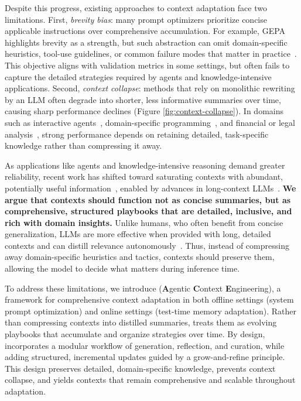 Despite this progress, existing approaches to context adaptation face two limitations.
First, \textit{brevity bias}: many prompt optimizers prioritize concise applicable instructions over comprehensive accumulation.
For example, GEPA~\citep{agrawal2025gepa} highlights brevity as a strength, but such abstraction can omit domain-specific heuristics, tool-use guidelines, or common failure modes that matter in practice~\citep{gao2025prompt}.
This objective aligns with validation metrics in some settings, but often fails to capture the detailed strategies required by agents and knowledge-intensive applications.
Second, \textit{context collapse}: methods that rely on monolithic rewriting by an LLM often degrade into shorter, less informative summaries over time, causing sharp performance declines (Figure \ref{fig:context-collapse}).
In domains such as interactive agents~\citep{trivedi2024appworld, patil2024gorilla, zhang2024caravan}, domain-specific programming~\citep{ye2023generating, zhang2025adaptive, zhang2025accelopt, mang2025frontiercs}, and financial or legal analysis~\citep{loukas2022finer, guha2023legalbench, wang2025finlora}, strong performance depends on retaining detailed, task-specific knowledge rather than compressing it away.

As applications like agents and knowledge-intensive reasoning demand greater reliability, recent work has shifted toward saturating contexts with abundant, potentially useful information~\citep{jiang2025putting, chung2025long, chen2025flora}, enabled by advances in long-context LLMs~\citep{peng2023yarn, mao2024lift}.
\textbf{We argue that contexts should function not as concise summaries, but as comprehensive, structured playbooks that are detailed, inclusive, and rich with domain insights.}
Unlike humans, who often benefit from concise generalization, LLMs are more effective when provided with long, detailed contexts and can distill relevance autonomously~\citep{jiang2025putting, liu2025selfelicit, suzgun2025dynamic}.
Thus, instead of compressing away domain-specific heuristics and tactics, contexts should preserve them, allowing the model to decide what matters during inference time.

To address these limitations, we introduce \name (\textbf{A}gentic \textbf{C}ontext \textbf{E}ngineering), a framework for comprehensive context adaptation in both offline settings (\eg system prompt optimization) and online settings (\eg test-time memory adaptation).
Rather than compressing contexts into distilled summaries, \name treats them as evolving playbooks that accumulate and organize strategies over time.
By design, \name incorporates a modular workflow of generation, reflection, and curation, while adding structured, incremental updates guided by a grow-and-refine principle.
This design preserves detailed, domain-specific knowledge, prevents context collapse, and yields contexts that remain comprehensive and scalable throughout adaptation.

